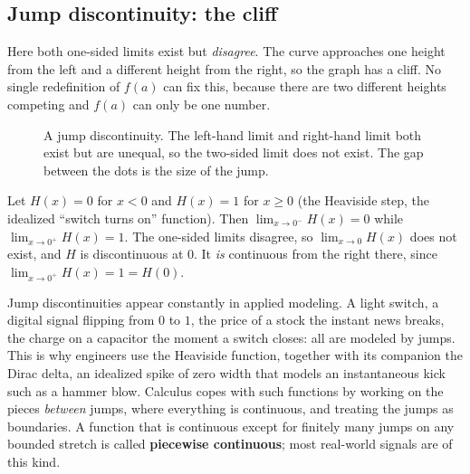 \subsection{Jump discontinuity: the cliff}

Here both one-sided limits exist but \emph{disagree}. The curve approaches one height from
the left and a different height from the right, so the graph has a cliff. No single
redefinition of $f(a)$ can fix this, because there are two different heights competing and
$f(a)$ can only be one number.

\begin{figure}[htbp]
\centering
{}
\caption{A jump discontinuity. The left-hand limit and right-hand limit both exist but
are unequal, so the two-sided limit does not exist. The gap between the dots is the size
of the jump.}
\label{ch08:fig-jump}
\end{figure}

\begin{example}
\label{ch08:ex-step}
Let $H(x)=0$ for $x<0$ and $H(x)=1$ for $x\ge 0$ (the Heaviside step, the idealized
``switch turns on'' function). Then $\lim_{x\to 0^-}H(x)=0$ while $\lim_{x\to 0^+}H(x)=1$.
The one-sided limits disagree, so $\lim_{x\to 0}H(x)$ does not exist, and $H$ is
discontinuous at $0$. It \emph{is} continuous from the right there, since
$\lim_{x\to 0^+}H(x)=1=H(0)$.
\end{example}

\begin{applicationbox}
Jump discontinuities appear constantly in applied modeling. A light
switch, a digital signal flipping from $0$ to $1$, the price of a stock the instant news
breaks, the charge on a capacitor the moment a switch closes: all are modeled by jumps.
This is why engineers use the Heaviside function, together with its companion the Dirac
delta, an idealized spike of zero width that models an instantaneous kick such as a hammer
blow. Calculus copes with such functions by working on the pieces \emph{between} jumps,
where everything is continuous, and treating the jumps as boundaries. A function that is
continuous except for finitely many jumps on any bounded stretch is called
\textbf{piecewise continuous}; most real-world signals are of this kind.
\end{applicationbox}


